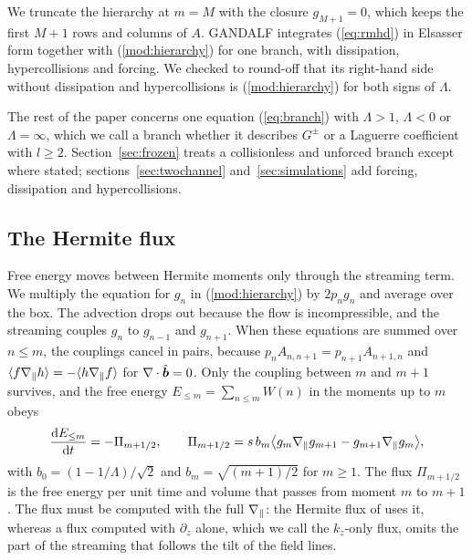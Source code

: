 We truncate the hierarchy at $m=M$ with the closure $g_{M+1}=0$, which keeps the first $M+1$ rows and columns of $A$. GANDALF \citep{Kanekar2025} integrates (\ref{eq:rmhd}) in Elsasser form together with (\ref{mod:hierarchy}) for one branch, with dissipation, hypercollisions and forcing. We checked to round-off that its right-hand side without dissipation and hypercollisions is (\ref{mod:hierarchy}) for both signs of $\Lambda$.

The rest of the paper concerns one equation (\ref{eq:branch}) with $\Lambda>1$, $\Lambda<0$ or $\Lambda=\infty$, which we call a branch whether it describes $G^\pm$ or a Laguerre coefficient with $l\ge2$. Section~\ref{sec:frozen} treats a collisionless and unforced branch except where stated; sections~\ref{sec:twochannel} and~\ref{sec:simulations} add forcing, dissipation and hypercollisions.

\subsection{The Hermite flux}\label{mod:flux}

Free energy moves between Hermite moments only through the streaming term. We multiply the equation for $g_n$ in (\ref{mod:hierarchy}) by $2p_ng_n$ and average over the box. The advection drops out because the flow is incompressible, and the streaming couples $g_n$ to $g_{n-1}$ and $g_{n+1}$. When these equations are summed over $n\le m$, the couplings cancel in pairs, because $p_nA_{n,n+1}=p_{n+1}A_{n+1,n}$ and $\langle f\nabla_\parallel h\rangle=-\langle h\nabla_\parallel f\rangle$ for $\nabla\cdot\hat{\boldsymbol b}=0$. Only the coupling between $m$ and $m+1$ survives, and the free energy $E_{\le m}=\sum_{n\le m}W(n)$ in the moments up to $m$ obeys
\begin{equation}\label{eq:fluxCD}
  \frac{\mathrm{d} E_{\le m}}{\mathrm{d} t}=-\Pi_{m+1/2},\qquad
  \Pi_{m+1/2}=s\,b_m\big\langle g_m\nabla_\parallel g_{m+1}-g_{m+1}\nabla_\parallel g_m\big\rangle,
\end{equation}
with $b_0=(1-1/\Lambda)/\sqrt2$ and $b_m=\sqrt{(m+1)/2}$ for $m\ge1$. The flux $\Pi_{m+1/2}$ is the free energy per unit time and volume that passes from moment $m$ to $m+1$. The flux must be computed with the full $\nabla_\parallel$: the Hermite flux of \citet{Meyrand2019} uses it, whereas a flux computed with $\partial_z$ alone, which we call the $k_z$-only flux, omits the part of the streaming that follows the tilt of the field lines.

